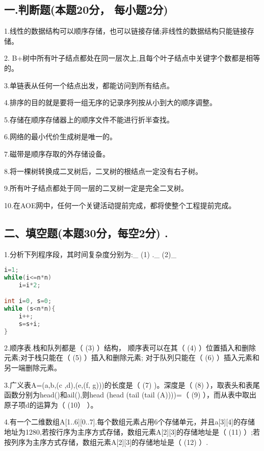 
\subsection{一.判断题(本题20分， 每小题2分)}

1.线性的数据结构可以顺序存储，也可以链接存储;非线性的数据结构只能链接存储。

2. B+树中所有叶子结点都处在同一层次上,且每个叶子结点中关键字个数都是相等的。

3.单链表从任何一个结点出发，都能访问到所有结点。

4.排序的目的就是要将一组无序的记录序列按从小到大的顺序调整。

5.存储在顺序存储器上的顺序文件不能进行折半查找。

6.网络的最小代价生成树是唯一的。

7.磁带是顺序存取的外存储设备。

8.将一棵树转换成二叉树后，二叉树的根结点一定没有右子树。

9.所有叶子结点都处于同一层的二叉树一定是完全二叉树。

10.在AOE网中，任何一个关键活动提前完成，都将使整个工程提前完成。

\subsection{二、填空题(本题30分，每空2分) .}

1.分析下列程序段，其时间复杂度分别为:\_ (1) .\_ (2)\_
\begin{lstlisting}[language=cpp]
i=1;
while(i<=n*n)
    i=i*2;

int i=0, s=0;
while (s<n*n){
    i++;
    s=s+i;
}
\end{lstlisting}

2.顺序表.栈和队列都是（ (3) ）结构， 顺序表可以在其（ (4) ）位置插入和删除元素;对于栈只能在（ (5) ）插入和删除元素; 对于队列只能在（ (6) ）插入元素和另一端删除元素。

3.广义表A=(a,b,(c ,d),(e,(f, g)))的长度是（ (7) )。深度是（ (8) ），取表头和表尾函数分别为head()和ail(),则head (head (tail (tail (A))))=（ (9) ），而从表中取出原子项d的运算为（ (10） ）。

4.有一个二维数组A[1..6][0..7].每个数组元素占用6个存储单元，并且a[3][4]的存储地址为1280,若按行序为主序方式存储，数组元素A[2][3]的存储地址是（ (11) ）;若按列序为主序方式存储，数组元素A[2][3]的存储地址是（ (12) ）.

